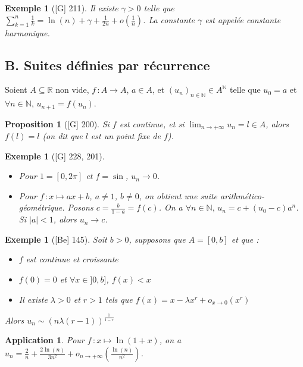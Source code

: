 \documentclass[10pt, a4paper, parskip=full, twoside, twocolumn]{report}
\newtheorem{proposition}[definition]{Proposition}
\newtheorem{example}[definition]{Exemple}
\newtheorem{application}[definition]{Application}
\newcommand{\IN}{\mathbb{N}}
\newcommand{\IR}{\mathbb{R}}
\begin{document}
\begin{example}[\textnormal{[G] 211}]
	Il existe $\gamma > 0$ telle que $\sum_{k=1}^{n} \frac{1}{k} = \ln(n)+\gamma + \frac{1}{2n} + o(\frac{1}{n})$.
	La constante $\gamma$ est appelée \emph{constante harmonique}.
\end{example}

\subsection*{B. Suites définies par récurrence}

\textcolor{paragraphtext}{Soient $A\subseteq \IR$ non vide, $f\,\colon A\to A$, $a\in A$, et $\left(u_n\right)_{n\in\IN}\in A^{\IN}$ telle que $u_0 = a$ et $\forall n\in\IN,\, u_{n+1} = f(u_n)$.}

\begin{proposition}[\textnormal{[G] 200}]
	Si $f$ est continue, et si $\displaystyle{\lim_{n\to +\infty} u_n =l \in A}$, alors $f(l) = l$ (on dit que $l$ est un \emph{point fixe de $f$}).
\end{proposition}

\begin{example}[\textnormal{[G] 228, 201}]
	\begin{itemize}
		\item Pour $1 = [0,2\pi]$ et $f = \sin$, $u_n \to 0$.
		\item Pour $f\,\colon x\mapsto ax+b$, $a\neq 1$, $b\neq 0$, on obtient une \emph{suite arithmético-géométrique}. Posons $c = \frac{b}{1-a} = f(c)$. On a $\forall n\in \IN,\, u_n = c + (u_0 - c)a^n$. Si $\vert a\vert < 1$, alors $u_n\to c$.
	\end{itemize}
\end{example}

\begin{tcolorbox}[
    breakable, %
    colback=developpement, %
    colframe=gray!0!black, %
    boxrule=0pt, %
    arc=1mm, %
	boxsep=0pt,
	left=0pt, right=0pt, top=0pt, bottom=0pt
]
\begin{example}[\textnormal{[Be] 145}]
	\label{223dev11}
	Soit $b > 0$, supposons que $A = [0,b]$ et que :
	\begin{itemize}
		\item $f$ est continue et croissante
		\item $f(0) = 0$ et $\forall x\in ]0,b]$, $f(x) < x$
		\item Il existe $\lambda >0$ et $r> 1$ tels que $f(x) = x - \lambda x^r + o_{x\to 0}(x^r)$
	\end{itemize}
	Alors $u_n \sim \left(n\lambda(r-1)\right)^{\frac{1}{1-r}}$
\end{example}

\begin{application}
	\label{223dev12}
	Pour $f\,\colon x\mapsto \ln(1+x)$, on a $u_n = \frac{2}{n} + \frac{2\ln(n)}{3n^2} + o_{n\to +\infty}(\frac{\ln(n)}{n^2})$.
\end{application}
\end{tcolorbox}
\end{document}
